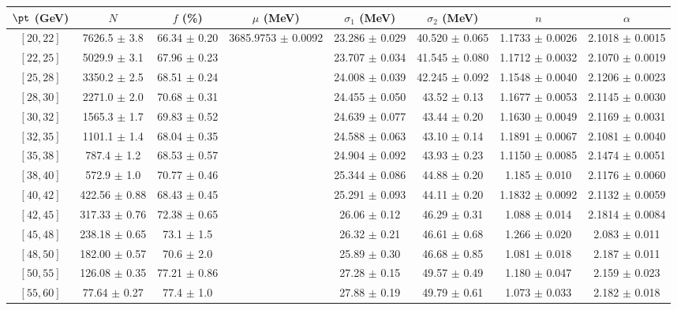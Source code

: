 \begin{tabular}{c||c|c|c|c|c|c|c}
$\pt$ (GeV) & $N$ & $f$ (\%) & $\mu$ (MeV) & $\sigma_1$ (MeV) & $\sigma_2$ (MeV) & $n$ & $\alpha$ \\
\hline
$[20, 22]$ & 7626.5 $\pm$ 3.8 & 66.34 $\pm$ 0.20 & \multirow{20}{*}{3685.9753 $\pm$ 0.0092} & 23.286 $\pm$ 0.029 & 40.520 $\pm$ 0.065 & 1.1733 $\pm$ 0.0026 & 2.1018 $\pm$ 0.0015\\
$[22, 25]$ & 5029.9 $\pm$ 3.1 & 67.96 $\pm$ 0.23 &  & 23.707 $\pm$ 0.034 & 41.545 $\pm$ 0.080 & 1.1712 $\pm$ 0.0032 & 2.1070 $\pm$ 0.0019\\
$[25, 28]$ & 3350.2 $\pm$ 2.5 & 68.51 $\pm$ 0.24 &  & 24.008 $\pm$ 0.039 & 42.245 $\pm$ 0.092 & 1.1548 $\pm$ 0.0040 & 2.1206 $\pm$ 0.0023\\
$[28, 30]$ & 2271.0 $\pm$ 2.0 & 70.68 $\pm$ 0.31 &  & 24.455 $\pm$ 0.050 & 43.52 $\pm$ 0.13 & 1.1677 $\pm$ 0.0053 & 2.1145 $\pm$ 0.0030\\
$[30, 32]$ & 1565.3 $\pm$ 1.7 & 69.83 $\pm$ 0.52 &  & 24.639 $\pm$ 0.077 & 43.44 $\pm$ 0.20 & 1.1630 $\pm$ 0.0049 & 2.1169 $\pm$ 0.0031\\
$[32, 35]$ & 1101.1 $\pm$ 1.4 & 68.04 $\pm$ 0.35 &  & 24.588 $\pm$ 0.063 & 43.10 $\pm$ 0.14 & 1.1891 $\pm$ 0.0067 & 2.1081 $\pm$ 0.0040\\
$[35, 38]$ & 787.4 $\pm$ 1.2 & 68.53 $\pm$ 0.57 &  & 24.904 $\pm$ 0.092 & 43.93 $\pm$ 0.23 & 1.1150 $\pm$ 0.0085 & 2.1474 $\pm$ 0.0051\\
$[38, 40]$ & 572.9 $\pm$ 1.0 & 70.77 $\pm$ 0.46 &  & 25.344 $\pm$ 0.086 & 44.88 $\pm$ 0.20 & 1.185 $\pm$ 0.010 & 2.1176 $\pm$ 0.0060\\
$[40, 42]$ & 422.56 $\pm$ 0.88 & 68.43 $\pm$ 0.45 &  & 25.291 $\pm$ 0.093 & 44.11 $\pm$ 0.20 & 1.1832 $\pm$ 0.0092 & 2.1132 $\pm$ 0.0059\\
$[42, 45]$ & 317.33 $\pm$ 0.76 & 72.38 $\pm$ 0.65 &  & 26.06 $\pm$ 0.12 & 46.29 $\pm$ 0.31 & 1.088 $\pm$ 0.014 & 2.1814 $\pm$ 0.0084\\
$[45, 48]$ & 238.18 $\pm$ 0.65 & 73.1 $\pm$ 1.5 &  & 26.32 $\pm$ 0.21 & 46.61 $\pm$ 0.68 & 1.266 $\pm$ 0.020 & 2.083 $\pm$ 0.011\\
$[48, 50]$ & 182.00 $\pm$ 0.57 & 70.6 $\pm$ 2.0 &  & 25.89 $\pm$ 0.30 & 46.68 $\pm$ 0.85 & 1.081 $\pm$ 0.018 & 2.187 $\pm$ 0.011\\
$[50, 55]$ & 126.08 $\pm$ 0.35 & 77.21 $\pm$ 0.86 &  & 27.28 $\pm$ 0.15 & 49.57 $\pm$ 0.49 & 1.180 $\pm$ 0.047 & 2.159 $\pm$ 0.023\\
$[55, 60]$ & 77.64 $\pm$ 0.27 & 77.4 $\pm$ 1.0 &  & 27.88 $\pm$ 0.19 & 49.79 $\pm$ 0.61 & 1.073 $\pm$ 0.033 & 2.182 $\pm$ 0.018\\

\end{tabular}
